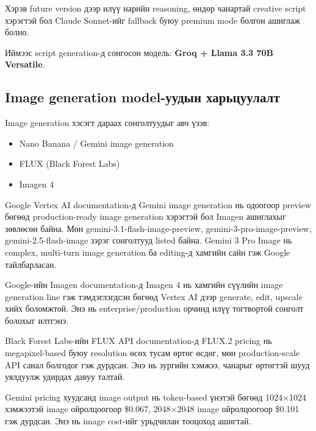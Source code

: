 Хэрэв future version дээр илүү нарийн reasoning, өндөр чанартай creative script хэрэгтэй бол Claude Sonnet-ийг fallback буюу premium mode болгон ашиглаж болно.

Иймээс script generation-д сонгосон модель: \textbf{Groq + Llama 3.3 70B Versatile}.

\subsection{Image generation model-уудын харьцуулалт}

Image generation хэсэгт дараах сонголтуудыг авч үзэв:

\begin{itemize}
\item Nano Banana / Gemini image generation
\item FLUX (Black Forest Labs)
\item Imagen 4
\end{itemize}

Google Vertex AI documentation-д Gemini image generation нь одоогоор preview бөгөөд production-ready image generation хэрэгтэй бол Imagen ашиглахыг зөвлөсөн байна. Мөн gemini-3.1-flash-image-preview, gemini-3-pro-image-preview, gemini-2.5-flash-image зэрэг сонголтууд listed байна. Gemini 3 Pro Image нь complex, multi-turn image generation ба editing-д хамгийн сайн гэж Google тайлбарласан.

Google-ийн Imagen documentation-д Imagen 4 нь хамгийн сүүлийн image generation line гэж тэмдэглэгдсэн бөгөөд Vertex AI дээр generate, edit, upscale хийх боломжтой. Энэ нь enterprise/production орчинд илүү тогтвортой сонголт болохыг илтгэнэ.

Black Forest Labs-ийн FLUX API documentation-д FLUX.2 pricing нь megapixel-based буюу resolution өсөх тусам өртөг өсдөг, мөн production-scale API санал болгодог гэж дурдсан. Энэ нь зургийн хэмжээ, чанарыг өртөгтэй шууд уялдуулж удирдах давуу талтай.

Gemini pricing хуудсанд image output нь token-based үнэтэй бөгөөд 1024×1024 хэмжээтэй image ойролцоогоор \$0.067, 2048×2048 image ойролцоогоор \$0.101 гэж дурдсан. Энэ нь image cost-ийг урьдчилан тооцоход ашигтай.

